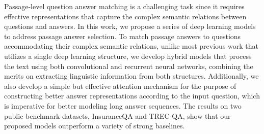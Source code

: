 Passage-level question answer matching is a challenging task since it requires effective representations that capture the complex semantic relations between questions and answers. In this work, we propose a series of deep learning models to address passage answer selection. To match passage answers to questions accommodating their complex semantic relations, unlike most previous work that utilizes a single deep learning structure, we develop hybrid models that process the text using both convolutional and recurrent neural networks, combining the merits on extracting linguistic information from both structures. Additionally, we also develop a simple but effective attention mechanism for the purpose of constructing better answer representations according to the input question, which is imperative for better modeling long answer sequences. The results on two public benchmark datasets, InsuranceQA and TREC-QA, show that our proposed models outperform a variety of strong baselines.
